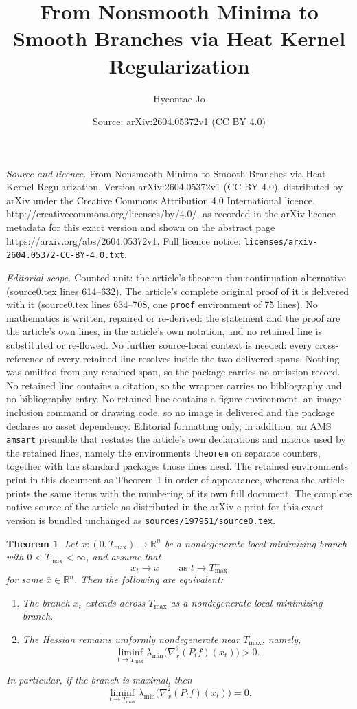 \documentclass[10pt,a4paper]{amsart}
\title{From Nonsmooth Minima to Smooth Branches via Heat Kernel Regularization}
\author{Hyeontae Jo}
\date{Source: arXiv:2604.05372v1 (CC BY 4.0)}
\newtheorem{theorem}{Theorem}
\begin{document}
\maketitle

\noindent\emph{Source and licence.} From Nonsmooth Minima to Smooth Branches via Heat Kernel Regularization. Version arXiv:2604.05372v1 (CC BY 4.0), distributed by arXiv under the Creative Commons Attribution 4.0 International licence, http://creativecommons.org/licenses/by/4.0/, as recorded in the arXiv licence metadata for this exact version and shown on the abstract page https://arxiv.org/abs/2604.05372v1. Full licence notice: \texttt{licenses/arxiv-2604.05372-CC-BY-4.0.txt}.\par\smallskip

\noindent\textit{Editorial scope.} Counted unit: the article's theorem thm:continuation-alternative (source0.tex lines 614--632). The article's complete original proof of it is delivered with it (source0.tex lines 634--708, one \texttt{proof} environment of 75 lines). No mathematics is written, repaired or re-derived: the statement and the proof are the article's own lines, in the article's own notation, and no retained line is substituted or re-flowed.  No further source-local context is needed: every cross-reference of every retained line resolves inside the two delivered spans.  Nothing was omitted from any retained span, so the package carries no omission record.  No retained line contains a citation, so the wrapper carries no bibliography and no bibliography entry.  No retained line contains a figure environment, an image-inclusion command or drawing code, so no image is delivered and the package declares no asset dependency.  Editorial formatting only, in addition: an AMS \texttt{amsart} preamble that restates the article's own declarations and macros used by the retained lines, namely the environments \texttt{theorem} on separate counters, together with the standard packages those lines need.  The retained environments print in this document as Theorem 1 in order of appearance, whereas the article prints the same items with the numbering of its own full document.  The complete native source of the article as distributed in the arXiv e-print for this exact version is bundled unchanged as \texttt{sources/197951/source0.tex}.
\begin{theorem}\label{thm:continuation-alternative}
Let $x:(0,T_{\max})\to\mathbb R^n$ be a nondegenerate local minimizing branch with $0<T_{\max}<\infty$, and assume that
$$
x_t\to \bar x
\qquad\text{as }t\to T_{\max}^-
$$
for some $\bar x\in\mathbb R^n$. Then the following are equivalent:
\begin{enumerate}
\item[(i)] The branch $x_t$ extends across $T_{\max}$ as a nondegenerate local minimizing branch.
\item[(ii)] The Hessian remains uniformly nondegenerate near $T_{\max}$, namely,
$$
\liminf_{t\to T_{\max}^-}\lambda_{\min}\bigl(\nabla_x^2(P_t f)(x_t)\bigr)>0.
$$
\end{enumerate}
In particular, if the branch is maximal, then
$$
\liminf_{t\to T_{\max}^-}\lambda_{\min}\bigl(\nabla_x^2(P_t f)(x_t)\bigr)=0.
$$
\end{theorem}
\end{document}
